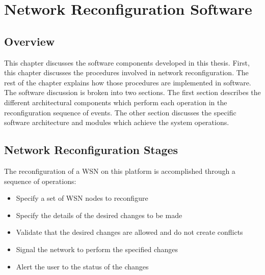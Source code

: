 
\chapter{Network Reconfiguration Software} %
\label{Chapter 4}
\lhead{} %

\section{Overview}
This chapter discusses the software components developed in this thesis. First, this chapter discusses the procedures involved in network reconfiguration. The rest of the chapter explains how those procedures are implemented in software. The software discussion is broken into two sections. The first section describes the different architectural components which perform each operation in the reconfiguration sequence of events. The other section discusses the specific software architecture and modules which achieve the system operations.


\section{Network Reconfiguration Stages}
The reconfiguration of a WSN on this platform is accomplished through a sequence of operations:

\begin{itemize}
	\item Specify a set of WSN nodes to reconfigure
	\item Specify the details of the desired changes to be made
	\item Validate that the desired changes are allowed and do not create conflicts
	\item Signal the network to perform the specified changes
	\item Alert the user to the status of the changes
\end{itemize}

